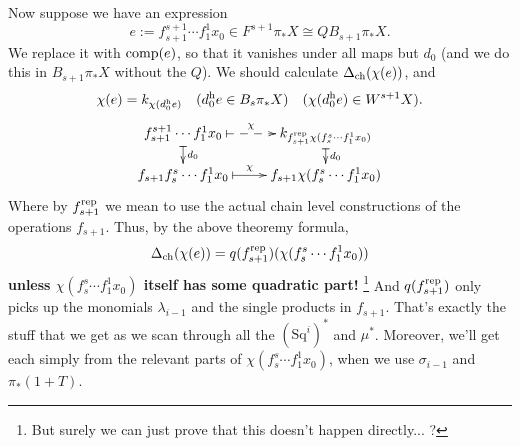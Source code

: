 \documentclass[10pt]{article}
\newcommand{\Sq}{\mathrm{Sq}}
\begin{document}
\begin{Koszul Actions}
Now suppose we have an expression 
\[e:=f^{s+1}_{s+1}\cdots f^1_1x_0\in F^{s+1}\pi_*X\cong QB_{s+1}\pi_*X.\]
We replace it with $\textup{comp}(e)$, so that it vanishes under all maps but $d_0$ (and we do this in $B_{s+1}\pi_*X$ without the $Q$). We should calculate $\Delta_\textup{ch}(\chi(e))$, and 
\[\chi(e)=k_{\chi(d_0^\textup{h}e)}\textup{\quad ($d_0^\textup{h}e\in B_s\pi_*X$)}
\textup{\quad ($\chi(d_0^\textup{h}e)\in W^{s+1}X$)}.\]
\[\xymatrix@R=4mm{
f^{s+1}_{s+1}\cdots f^1_1x_0\ar@{|->}[d]^-{d_0}
\ar@{|-->}[r]^-{\chi}
&%
k_{f^\textup{rep}_{s+1}\chi(f_s^s\cdots f^1_1x_0)}\ar@{|->}[d]^-{d_0}
\\%
f_{s+1}f_s^s\cdots f^1_1x_0\ar@{|->}[r]^-{\chi}&%
f_{s+1}\chi(f_s^s\cdots f^1_1x_0)%
}\]
Where by $f^\textup{rep}_{s+1}$ we mean to use the actual chain level constructions of the operations $f_{s+1}$. Thus, by the above theoremy formula, 
\[\Delta_\textup{ch}(\chi(e))=q(f^\textup{rep}_{s+1})(\chi(f_s^s\cdots f^1_1x_0))\]
\textbf{unless $\chi(f_s^s\cdots f^1_1x_0)$ itself has some quadratic part!}%
\footnote{But surely we can just prove that this doesn't happen directly... ?}
And $q(f^\textup{rep}_{s+1})$ only picks up the monomials $\lambda_{i-1}$ and the single products in $f_{s+1}$. That's exactly the stuff that we get as we scan through all the $(\Sq^i)^*$ and $\mu^*$. Moreover, we'll get each simply from the relevant parts of $\chi(f^s_s\cdots f^1_1x_0)$, when we use $\sigma_{i-1}$ and $\pi_*(1+T)$.




\end{Koszul Actions}
\end{document}

